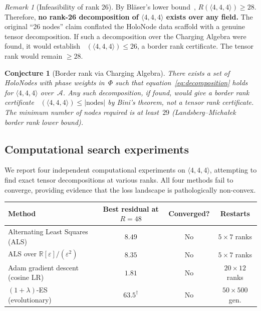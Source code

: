 \documentclass[11pt,a4paper]{article}
\newtheorem{conjecture}{Conjecture}[section]
\theoremstyle{definition}
\theoremstyle{remark}
\newtheorem{remark}[theorem]{Remark}
\DeclareMathOperator{\brank}{\underline{R}}
\newcommand{\mmtensor}[3]{\langle #1, #2, #3 \rangle}
\begin{document}
\begin{remark}[Infeasibility of rank 26]
By Bl\"aser's lower bound~\cite{Blaser2003},
$R(\mmtensor{4}{4}{4}) \ge 28$. Therefore, \textbf{no rank-26
decomposition of $\mmtensor{4}{4}{4}$ exists over any field.}
The original ``26 nodes'' claim conflated the HoloNode data
scaffold with a genuine tensor decomposition. If such a
decomposition over the Charging Algebra were found, it would
establish $\brank(\mmtensor{4}{4}{4}) \le 26$, a border rank
certificate. The tensor rank would remain $\ge 28$.
\end{remark}

\begin{conjecture}[Border rank via Charging Algebra]
  \label{conj:completion}
There exists a set of HoloNodes with phase weights in~$\Phi$
such that equation~\eqref{eq:decomposition} holds for
$\mmtensor{4}{4}{4}$ over~$\mathcal{A}$. Any such
decomposition, if found, would give a border rank certificate
$\brank(\mmtensor{4}{4}{4}) \le |\text{nodes}|$ by
Bini's theorem, not a tensor rank certificate.
The minimum number of nodes required is at least~$29$
(Landsberg--Micha{\l}ek border rank lower bound).
\end{conjecture}

\subsection{Computational search experiments}
\label{sec:computational}


We report four independent computational experiments on
$\mmtensor{4}{4}{4}$, attempting to find exact tensor decompositions
at various ranks. All four methods fail to converge, providing
evidence that the loss landscape is pathologically non-convex.

\begin{center}
\begin{tabular}{l|c|c|c}
\textbf{Method} & \textbf{Best residual at $R\!=\!48$}
  & \textbf{Converged?} & \textbf{Restarts} \\ \hline
Alternating Least Squares (ALS)
  & $8.49$ & No & $5 \times 7$ ranks \\
ALS over $\mathbb{R}[\varepsilon]/(\varepsilon^2)$
  & $8.35$ & No & $5 \times 7$ ranks \\
Adam gradient descent (cosine LR)
  & $\mathbf{1.81}$ & No & $20 \times 12$ ranks \\
$(1\!+\!\lambda)$-ES (evolutionary)
  & $63.5^\dagger$ & No & $50 \times 500$ gen.\\
\end{tabular}
\end{center}
\end{document}
